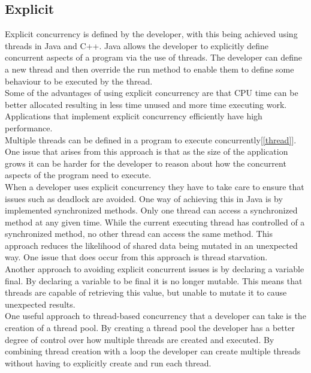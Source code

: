 \documentclass[10pt]{article}  %
\theoremstyle{definition}
\theoremstyle{remark}
\begin{document}
\subsection{Explicit}\label{ss:back}


Explicit concurrency is defined by the developer, with this being achieved using threads in Java and C++.   Java allows the developer to explicitly define concurrent aspects of a program via the use of threads. The developer can define a new thread and then override the run method to enable them to define some behaviour to be executed by the thread.\\

Some of the advantages of using explicit concurrency are that CPU time can be better allocated resulting in less time unused and more time executing work. Applications that implement explicit concurrency efficiently have high performance.\\ 

Multiple threads can be defined in a program to execute concurrently[\ref{thread}]. One issue that arises from this approach is that as the size of the application grows it can be harder for the developer to reason about how the concurrent aspects of the program need to execute.\\

When a developer uses explicit concurrency they have to take care to ensure that issues such as deadlock are avoided. One way of achieving this in Java is by implemented synchronized methods. Only one thread can access a synchronized method at any given time. While the current executing thread has controlled of a synchronized method, no other thread can access the same method. This approach reduces the likelihood of shared data being mutated in an unexpected way. One issue that does occur from this approach is thread starvation.\\

Another approach to avoiding explicit concurrent issues is by declaring a variable final. By declaring a variable to be final it is no longer mutable. This means that threads are capable of retrieving this value, but unable to mutate it to cause unexpected results.\\

One useful approach to thread-based concurrency that a developer can take is the creation of a thread pool. By creating a thread pool the developer has a better degree of control over how multiple threads are created and executed. By combining thread creation with a loop the developer can create multiple threads without having to explicitly create and run each thread.\\
\end{document}
